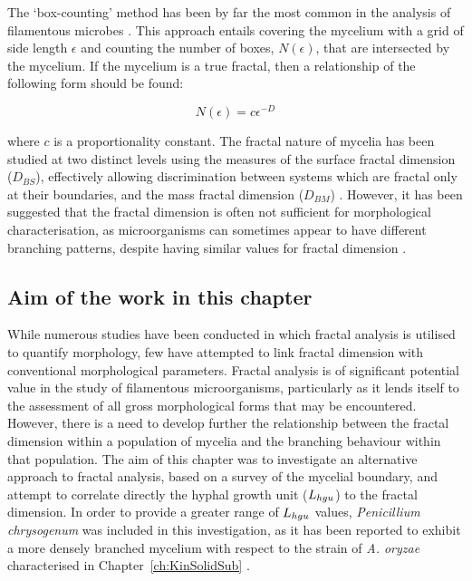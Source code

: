 The \lq box-counting' method has been by far the most common in the analysis of filamentous microbes \cite{obert1990}. This approach entails covering the mycelium with a grid of side length $\epsilon$ and counting the number of boxes, $N(\epsilon)$, that are intersected by the mycelium. If the mycelium is a true fractal, then a relationship of the following form should be found:

\begin{equation} \label{eq:NeD}
	N(\epsilon)=c \epsilon^{-D}
\end{equation}

\noindent where $c$ is a proportionality constant. The fractal nature of mycelia has been studied at two distinct levels using the measures of the surface fractal dimension ($D_{BS}$), effectively allowing discrimination between systems which are fractal only at their boundaries, and the mass fractal dimension ($D_{BM}$) \cite{obert1990,papagianni2006b}. However, it has been suggested that the fractal dimension is often not sufficient for morphological characterisation, as microorganisms can sometimes appear to have different branching patterns, despite having similar values for fractal dimension \cite{boddy2008}.

\subsection{Aim of the work in this chapter}

While numerous studies have been conducted in which fractal analysis is utilised to quantify  morphology, few have attempted to link fractal dimension with conventional morphological parameters. Fractal analysis is of significant potential value in the study of filamentous microorganisms, particularly as it lends itself to the assessment of all gross morphological forms that may be encountered. However, there is a need to develop further the relationship between the fractal dimension within a population of mycelia and the branching behaviour within that population. The aim of this chapter was to investigate an alternative approach to fractal analysis, based on a survey of the mycelial boundary, and attempt to correlate directly the hyphal growth unit ($L_{hgu}$) to the fractal dimension. In order to provide a greater range of $L_{hgu}$ values, \emph{Penicillium chrysogenum} was included in this investigation, as it has been reported to exhibit a more densely branched mycelium with respect to the strain of \emph{A. oryzae} characterised in Chapter~\ref{ch:KinSolidSub} \cite{mcintyre1998,elsabbagh2006}.